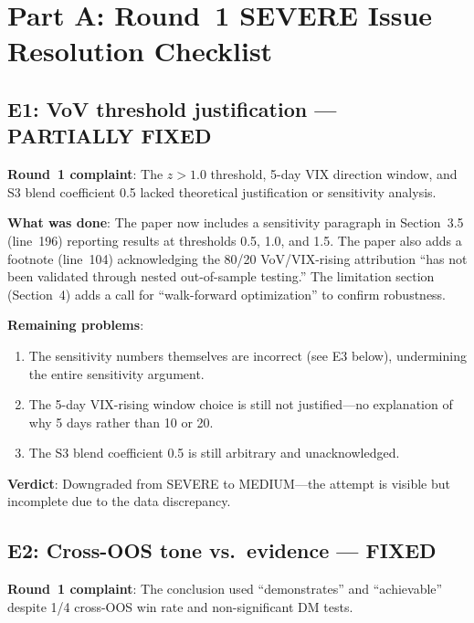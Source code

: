 \documentclass[12pt,a4paper]{article}
\begin{document}
\section*{Part A: Round~1 SEVERE Issue Resolution Checklist}

\subsection*{\textcolor{fixedblue}{E1: VoV threshold justification --- PARTIALLY FIXED}}

\textbf{Round~1 complaint}: The $z > 1.0$ threshold, 5-day VIX direction window, and S3 blend coefficient 0.5 lacked theoretical justification or sensitivity analysis.

\textbf{What was done}: The paper now includes a sensitivity paragraph in Section~3.5 (line~196) reporting results at thresholds 0.5, 1.0, and 1.5. The paper also adds a footnote (line~104) acknowledging the 80/20 VoV/VIX-rising attribution ``has not been validated through nested out-of-sample testing.'' The limitation section (Section~4) adds a call for ``walk-forward optimization'' to confirm robustness.

\textbf{Remaining problems}:
\begin{enumerate}[leftmargin=2em]
\item The sensitivity numbers themselves are incorrect (see E3 below), undermining the entire sensitivity argument.
\item The 5-day VIX-rising window choice is still not justified---no explanation of why 5 days rather than 10 or 20.
\item The S3 blend coefficient 0.5 is still arbitrary and unacknowledged.
\end{enumerate}

\textbf{Verdict}: \textcolor{warncolor}{Downgraded from SEVERE to MEDIUM}---the attempt is visible but incomplete due to the data discrepancy.

\bigskip

\subsection*{\textcolor{fixedblue}{E2: Cross-OOS tone vs.\ evidence --- FIXED}}

\textbf{Round~1 complaint}: The conclusion used ``demonstrates'' and ``achievable'' despite 1/4 cross-OOS win rate and non-significant DM tests.
\end{document}
